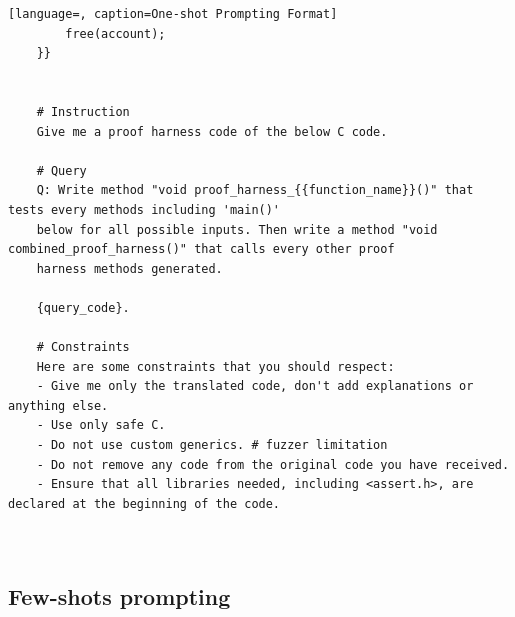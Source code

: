 \documentclass[onecolumn]{NobArticle}
\begin{document}
\begin{lstlisting}[language=, caption=One-shot Prompting Format]
        free(account);
    }}


    # Instruction
    Give me a proof harness code of the below C code.

    # Query 
    Q: Write method "void proof_harness_{{function_name}}()" that tests every methods including 'main()' 
    below for all possible inputs. Then write a method "void combined_proof_harness()" that calls every other proof 
    harness methods generated. 
    
    {query_code}.

    # Constraints
    Here are some constraints that you should respect:
    - Give me only the translated code, don't add explanations or anything else. 
    - Use only safe C.
    - Do not use custom generics. # fuzzer limitation
    - Do not remove any code from the original code you have received.
    - Ensure that all libraries needed, including <assert.h>, are declared at the beginning of the code.

    
\end{lstlisting}


\subsection{Few-shots prompting}
\end{document}
